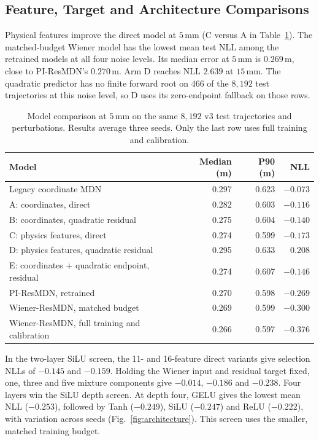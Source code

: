 \documentclass[11pt,a4paper]{article}
\begin{document}
\FloatBarrier

\subsection{Feature, Target and Architecture Comparisons}
\label{sec:comparisons}

Physical features improve the direct model at $5\,\mathrm{mm}$ (C versus A in Table~\ref{tab:modelcomparison}). The matched-budget Wiener model has the lowest mean test NLL among the retrained models at all four noise levels. Its median error at $5\,\mathrm{mm}$ is $0.269\,\mathrm{m}$, close to PI-ResMDN's $0.270\,\mathrm{m}$. Arm D reaches NLL $2.639$ at $15\,\mathrm{mm}$. The quadratic predictor has no finite forward root on $466$ of the $8{,}192$ test trajectories at this noise level, so D uses its zero-endpoint fallback on those rows.

\begin{table}[htbp]
  \centering
  \small
  \caption{Model comparison at $5\,\mathrm{mm}$ on the same $8{,}192$ v3 test trajectories and perturbations. Results average three seeds. Only the last row uses full training and calibration.}
  \label{tab:modelcomparison}
  \begin{tabular}{lrrr}
    \toprule
    Model & Median (m) & P90 (m) & NLL \\
    \midrule
    Legacy coordinate MDN & 0.297 & 0.623 & $-0.073$ \\
    A: coordinates, direct & 0.282 & 0.603 & $-0.116$ \\
    B: coordinates, quadratic residual & 0.275 & 0.604 & $-0.140$ \\
    C: physics features, direct & 0.274 & 0.599 & $-0.173$ \\
    D: physics features, quadratic residual & 0.295 & 0.633 & $0.208$ \\
    E: coordinates + quadratic endpoint, residual & 0.274 & 0.607 & $-0.146$ \\
    PI-ResMDN, retrained & 0.270 & 0.598 & $-0.269$ \\
    Wiener-ResMDN, matched budget & 0.269 & 0.599 & $-0.300$ \\
    Wiener-ResMDN, full training and calibration & 0.266 & 0.597 & $-0.376$ \\
    \bottomrule
  \end{tabular}
\end{table}

In the two-layer SiLU screen, the 11- and 16-feature direct variants give selection NLLs of $-0.145$ and $-0.159$. Holding the Wiener input and residual target fixed, one, three and five mixture components give $-0.014$, $-0.186$ and $-0.238$. Four layers win the SiLU depth screen. At depth four, GELU gives the lowest mean NLL ($-0.253$), followed by Tanh ($-0.249$), SiLU ($-0.247$) and ReLU ($-0.222$), with variation across seeds (Fig.~\ref{fig:architecture}). This screen uses the smaller, matched training budget.
\end{document}
